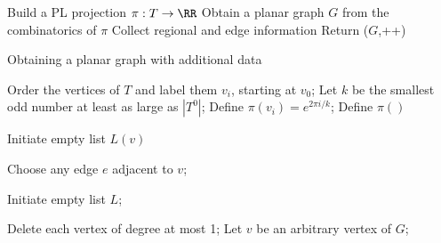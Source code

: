 \begin{algorithm}
  \label{alg:a1over}
     
      Build a PL projection $\pi:T\to\RR$\;
      Obtain a planar graph $G$ from the combinatorics of $\pi$\; 
      Collect regional and edge information\;
      Return ($G$,++)
      
    \caption{Obtaining a planar graph with additional data}
\end{algorithm}


\begin{algorithm}

  Order the vertices of $T$ and label them $v_i$, starting at $v_0$;
  Let $k$ be the smallest odd number at least as large as $|T^0|$;
  {
    Define $\pi(v_i)=e^{2\pi i/k}$;
  }
  {
    Define $\pi()$
  }

\end{algorithm}


\begin{algorithm}

  Initiate empty list $L(v)$

  {
    Choose any edge $e$ adjacent to $v$;
  }

\end{algorithm}


\begin{algorithm}
    
    Initiate empty list $L$;
    
    {
      {
        Delete each vertex of degree at most 1;
      }
      Let $v$ be an arbitrary vertex of $G$;
    }
\end{algorithm}

